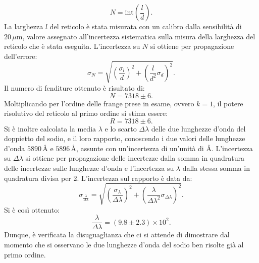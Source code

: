 \documentclass[a4paper,12pt]{article}
\begin{document}
\[
N = \text{int}\left(\frac{l}{d}\right).
\]
La larghezza \( l \) del reticolo è stata misurata con un calibro dalla sensibilità di \( 20 \, \mu\text{m} \), valore assegnato all’incertezza sistematica sulla misura della larghezza del reticolo che è stata eseguita.
L’incertezza su \( N \) si ottiene per propagazione dell’errore:
\[
\sigma_N = \sqrt{\left(\frac{\sigma_l}{d}\right)^2 + \left(\frac{l}{d^2}\sigma_d\right)^2}.
\]
Il numero di fenditure ottenuto è risultato di:
\[
N = 7318 \pm 6.
\]
Moltiplicando per l’ordine delle frange prese in esame, ovvero \( k = 1 \), il potere risolutivo del reticolo al primo ordine si stima essere:
\[
R = 7318 \pm 6.
\]
Si è inoltre calcolata la media \( \lambda \) e lo scarto \( \Delta\lambda \) delle due lunghezze d’onda del doppietto del sodio, e il loro rapporto, conoscendo i due valori delle lunghezze d’onda \( 5890 \, \text{\AA} \) e \( 5896 \, \text{\AA} \), assunte con un’incertezza di un’unità di \(\text{\AA}\).
L’incertezza su \( \Delta\lambda \) si ottiene per propagazione delle incertezze dalla somma in quadratura delle incertezze sulle lunghezze d’onda e l’incertezza su \( \lambda \) dalla stessa somma in quadratura divisa per 2.
L’incertezza sul rapporto è data da:
\[
\sigma_{\frac{\lambda}{\Delta\lambda}} = \sqrt{\left(\frac{\sigma_\lambda}{\Delta\lambda}\right)^2 + \left(\frac{\lambda}{\Delta\lambda^2}\sigma_{\Delta\lambda}\right)^2}.
\]
Si è così ottenuto:
\[
\frac{\lambda}{\Delta\lambda} = (9.8 \pm 2.3) \times 10^2.
\]
Dunque, è verificata la disuguaglianza che ci si attende di dimostrare dal momento che si osservano le due lunghezze d’onda del sodio ben risolte già al primo ordine.
\end{document}
